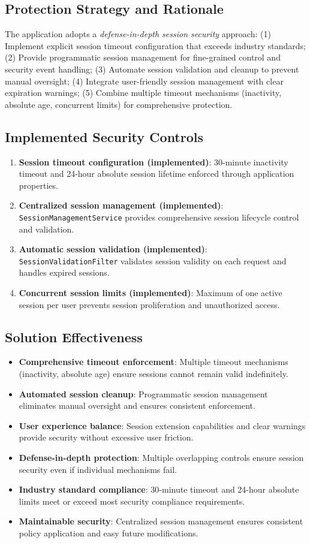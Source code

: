 \documentclass[]{UCD_CS_FYP_Report}
\begin{document}
\subsection{Protection Strategy and Rationale}
The application adopts a \textit{defense-in-depth session security} approach: (1) Implement explicit session timeout configuration that exceeds industry standards; (2) Provide programmatic session management for fine-grained control and security event handling; (3) Automate session validation and cleanup to prevent manual oversight; (4) Integrate user-friendly session management with clear expiration warnings; (5) Combine multiple timeout mechanisms (inactivity, absolute age, concurrent limits) for comprehensive protection.

\subsection{Implemented Security Controls}
\begin{enumerate}
	\item \textbf{Session timeout configuration (implemented)}: 30-minute inactivity timeout and 24-hour absolute session lifetime enforced through application properties.
	\item \textbf{Centralized session management (implemented)}: \texttt{SessionManagementService} provides comprehensive session lifecycle control and validation.
	\item \textbf{Automatic session validation (implemented)}: \texttt{SessionValidationFilter} validates session validity on each request and handles expired sessions.
	\item \textbf{Concurrent session limits (implemented)}: Maximum of one active session per user prevents session proliferation and unauthorized access.
\end{enumerate}

\subsection{Solution Effectiveness}
\begin{itemize}
	\item \textbf{Comprehensive timeout enforcement}: Multiple timeout mechanisms (inactivity, absolute age) ensure sessions cannot remain valid indefinitely.
	\item \textbf{Automated session cleanup}: Programmatic session management eliminates manual oversight and ensures consistent enforcement.
	\item \textbf{User experience balance}: Session extension capabilities and clear warnings provide security without excessive user friction.
	\item \textbf{Defense-in-depth protection}: Multiple overlapping controls ensure session security even if individual mechanisms fail.
	\item \textbf{Industry standard compliance}: 30-minute timeout and 24-hour absolute limits meet or exceed most security compliance requirements.
	\item \textbf{Maintainable security}: Centralized session management ensures consistent policy application and easy future modifications.
\end{itemize}
\end{document}
